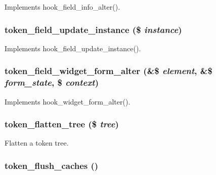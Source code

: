 \label{token_8module_af9c21176f345bfcac32fc7628f06bc1a}
Implements hook\_\-field\_\-info\_\-alter(). \hypertarget{token_8module_a444dc40d459c42573e310276c66b1389}{
\subsubsection[{token\_\-field\_\-update\_\-instance}]{\setlength{\rightskip}{0pt plus 5cm}token\_\-field\_\-update\_\-instance (\$ {\em instance})}}
\label{token_8module_a444dc40d459c42573e310276c66b1389}
Implements hook\_\-field\_\-update\_\-instance(). \hypertarget{token_8module_a5f0558b9a02d03e37b242199ab380174}{
\subsubsection[{token\_\-field\_\-widget\_\-form\_\-alter}]{\setlength{\rightskip}{0pt plus 5cm}token\_\-field\_\-widget\_\-form\_\-alter (\&\$ {\em element}, \/  \&\$ {\em form\_\-state}, \/  \$ {\em context})}}
\label{token_8module_a5f0558b9a02d03e37b242199ab380174}
Implements hook\_\-widget\_\-form\_\-alter(). \hypertarget{token_8module_a26a3276436562b162a658b74d58acd7f}{
\subsubsection[{token\_\-flatten\_\-tree}]{\setlength{\rightskip}{0pt plus 5cm}token\_\-flatten\_\-tree (\$ {\em tree})}}
\label{token_8module_a26a3276436562b162a658b74d58acd7f}
Flatten a token tree. \hypertarget{token_8module_ae34f0dc7cf6af04b24b316b824b2fe27}{
\subsubsection[{token\_\-flush\_\-caches}]{\setlength{\rightskip}{0pt plus 5cm}token\_\-flush\_\-caches ()}}
